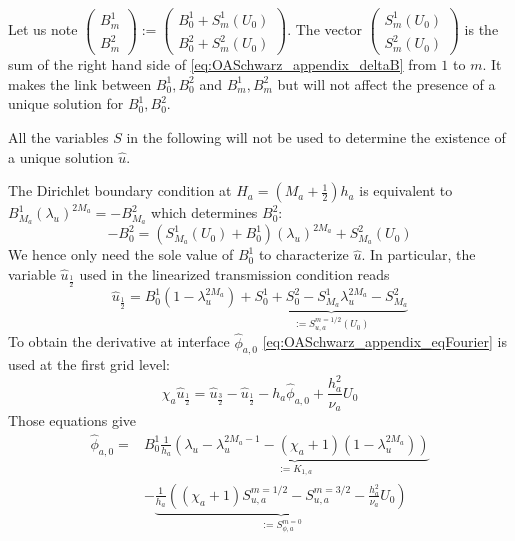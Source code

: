 Let us note 
$\begin{pmatrix}
B_m^1\\
B_m^2
\end{pmatrix}
:= \begin{pmatrix}
	 B^1_0 + S_m^1(U_0)\\
	 B^2_0 + S_m^2(U_0)
\end{pmatrix}$.
The vector $\begin{pmatrix} S_m^1(U_0)\\ S_m^2(U_0) \end{pmatrix}$
is the sum of the right hand side of
\eqref{eq:OASchwarz_appendix_deltaB} from $1$ to $m$. It makes
the link between $B^1_0, B^2_0$ and $B^1_m, B^2_m$ but will not
affect the presence of a unique solution for $B^1_0, B^2_0$.
\begin{remark}
	All the variables $S$ in the following will not be used
	to determine the existence of a unique solution
	$\widehat{u}$.
\end{remark}
The Dirichlet boundary condition at $H_a = (M_a + \frac{1}{2})h_a$
is equivalent to
$B_{M_a}^1 (\lambda_u)^{2M_a} = - B_{M_a}^2$ which determines
$B^2_0$:
\begin{equation}
- B^2_0 = \left(S_{M_a}^1(U_0) + B^1_0\right)
	(\lambda_u)^{2M_a} + S_{M_a}^2(U_0)
\end{equation}
We hence only need the sole value of $B^1_0$ to characterize
$\widehat{u}$. In particular, the variable $\widehat{u}_{\frac{1}{2}}$
used in the linearized transmission condition reads
\begin{equation}
	\widehat{u}_{\frac{1}{2}} = B^1_0 (1 - \lambda_u^{2M_a})
	+ \underbrace{S_0^1+S_0^2 - S_{M_a}^1 \lambda_u^{2M_a}
		-S_{M_a}^2}_{:=S_{u, a}^{m=1/2}(U_0)}
\end{equation}
To obtain the derivative at interface $\widehat{\phi}_{a,0}$
\eqref{eq:OASchwarz_appendix_eqFourier} is used
at the first grid level:
\begin{equation}
	\chi_a \widehat{u}_{\frac{1}{2}} =
	\widehat{u}_{\frac{3}{2}} - \widehat{u}_{\frac{1}{2}}
	- h_a \widehat{\phi}_{a,0} + \frac{h^2_a}{\nu_a} U_0
\end{equation}
Those equations give
\begin{equation}
	\begin{aligned}
		\widehat{\phi}_{a,0} =& B^1_0 \underbrace{\frac{1}{h_a}
		\left(
			\lambda_u-\lambda_u^{2M_a-1}
			- (\chi_a+1)(1-\lambda_u^{2M_a})
			\right)}_{:=K_{1,a}}\\
		&-\underbrace{\frac{1}{h_a}\left((\chi_a + 1) S_{u,a}^{m=1/2}
		- S_{u,a}^{m=3/2}
		- \frac{h_a^2}{\nu_a} U_0\right)}_{:=S_{\phi,a}^{m=0}}
	\end{aligned}
\end{equation}

